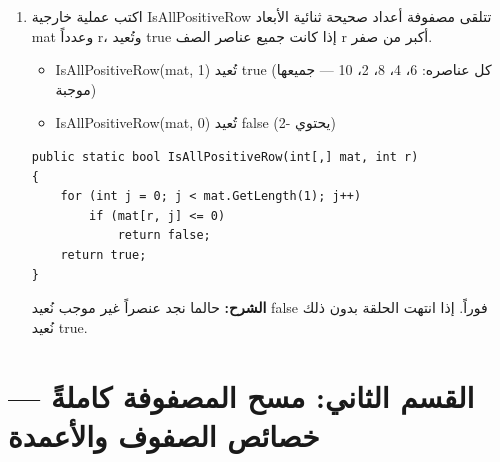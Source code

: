 \documentclass[14pt]{extarticle}
\begin{document}
\begin{enumerate}[itemsep=2em]
\item
اكتب عملية خارجية \textenglish{IsAllPositiveRow} تتلقى مصفوفة أعداد صحيحة ثنائية الأبعاد \textenglish{mat} وعدداً \textenglish{r}، وتُعيد \textenglish{true} إذا كانت جميع عناصر الصف \textenglish{r} أكبر من صفر.

\begin{boxExample}
\begin{itemize}[itemsep=1pt]
    \item \textenglish{IsAllPositiveRow(mat, 1)} تُعيد \textenglish{true} (كل عناصره: 6، 4، 8، 2، 10 — جميعها موجبة)
    \item \textenglish{IsAllPositiveRow(mat, 0)} تُعيد \textenglish{false} (يحتوي \textenglish{-2})
\end{itemize}
\end{boxExample}

\ifwithsols
\begin{boxSolution}
\begin{boxCode}
\begin{english}
\begin{verbatim}
public static bool IsAllPositiveRow(int[,] mat, int r)
{
    for (int j = 0; j < mat.GetLength(1); j++)
        if (mat[r, j] <= 0)
            return false;
    return true;
}
\end{verbatim}
\end{english}
\end{boxCode}
\textbf{الشرح:} حالما نجد عنصراً غير موجب نُعيد \textenglish{false} فوراً. إذا انتهت الحلقة بدون ذلك نُعيد \textenglish{true}.
\end{boxSolution}
\fi

\end{enumerate}

\clearpage
\section*{القسم الثاني: مسح المصفوفة كاملةً — خصائص الصفوف والأعمدة}
\end{document}
